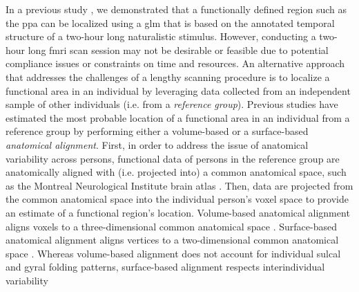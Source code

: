 In a previous study \citep{haeusler2022processing}, we demonstrated that a
functionally defined region such as the \ac{ppa} can be localized using  a
\acf{glm} that is based on the annotated temporal structure of a two-hour long
naturalistic stimulus.
However, conducting a two-hour long \ac{fmri} scan session may not be desirable
or feasible due to potential compliance issues or constraints on time and
resources.
An alternative approach that addresses the challenges of a lengthy scanning
procedure is to localize a functional area in an individual by leveraging data
collected from an independent sample of other individuals (i.e. from a
\textit{reference group}).
Previous studies have estimated the most probable location of a functional area
in an individual from a reference group by performing either a volume-based
\citep{zhen2017quantifying, zhen2015quantifying} or a surface-based
\citep{frost2012measuring, weiner2018defining, rosenke2021probabilistic,
wang2015probabilistic} \textit{anatomical alignment}.
%
First, in order to address the issue of anatomical variability across persons,
functional data of persons in the reference group are anatomically aligned with
(i.e. projected into) a common anatomical space, such as the Montreal
Neurological Institute brain atlas \citep[MNI152 atlas;][]{fonov2011unbiased}.
Then, data are projected from the common anatomical space into the individual
person's voxel space to provide an estimate of a functional region's location.
Volume-based anatomical alignment \citep[s.][for a review]{klein2009evaluation}
aligns voxels to a three-dimensional common anatomical space \citep[e.g., MNI152
atlas;][]{fonov2011unbiased}.
Surface-based anatomical alignment \citep{fischl1999cortical, yeo2009spherical}
aligns vertices to a two-dimensional common anatomical space \citep[e.g.,
FreeSurfer's fsaverage template;][]{fischl1999high}.
Whereas volume-based alignment does not account for individual sulcal and gyral
folding patterns, surface-based alignment respects interindividual variability
